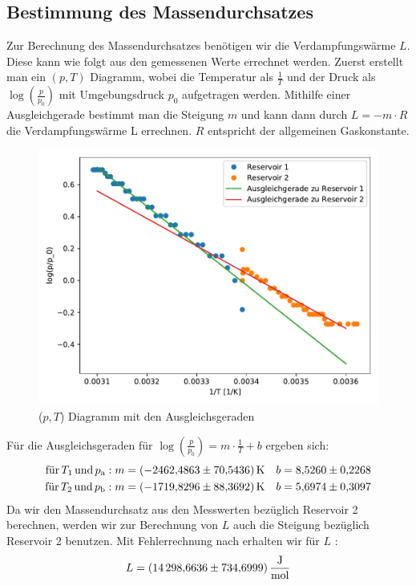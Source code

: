 \subsection{Bestimmung des Massendurchsatzes}
Zur Berechnung des Massendurchsatzes benötigen wir die Verdampfungswärme $L$. 
Diese kann wie folgt aus den gemessenen Werte errechnet werden. 
Zuerst erstellt man ein $(p,T)$ Diagramm, wobei die Temperatur als $\frac{1}{T}$ und der Druck als $\log(\frac{p}{p_0})$ mit Umgebungsdruck $p_0$ aufgetragen werden.
Mithilfe einer Ausgleichgerade bestimmt man die Steigung $m$ und kann dann durch $L=-m\cdot R$ die Verdampfungswärme L errechnen. 
$R$ entspricht der allgemeinen Gaskonstante.
\begin{figure}
  \centering
  \caption{($p,T$) Diagramm mit den Ausgleichsgeraden}
  \includegraphics{TempDruck.pdf}
\end{figure}
Für die Ausgleichsgeraden für $\log(\frac{p}{p_0}) = m\cdot\frac{1}{T} + b$ ergeben sich:
\begin{align*}
  \text{für} \, T_1 \, \text{und} \, p_{\text{a}}: m&= \SI{-2462.4863 \pm 70.5436}{\kelvin} & b&=\num{8.5260 \pm 0.2268} \\
  \text{für} \, T_2 \, \text{und} \, p_{\text{b}}: m&= \SI{-1719.8296 \pm 88.3692}{\kelvin} & b&=\num{5.6974 \pm 0.3097}
\end{align*}
Da wir den Massendurchsatz aus den Messwerten bezüglich Reservoir 2 berechnen, werden wir zur Berechnung von $L$ auch die Steigung bezüglich Reservoir 2 benutzen.
Mit Fehlerrechnung nach \cite{fehler} erhalten wir für $L$ :
\begin{equation*}
  L = \SI{14298.6636\pm 734.6999}{\joule\per\mole}
\end{equation*}
